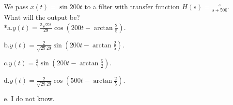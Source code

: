 
We pass \(x\left( t \right) = \sin 200t\) to a filter with transfer function \(H\left( s \right) = \frac{s}{s + 500}\). What will the output be?\\

*a.\(y\left( t \right) = \frac{2\sqrt{29}}{29}\cos\left( 200t - \arctan\frac{2}{5} \right)\).

b.\(y\left( t \right) = \frac{2}{\sqrt{29}29}\sin\left( 200t - \arctan\frac{2}{5} \right)\).

c.\(y\left( t \right) = \frac{2}{7}\sin\left( 200t - \arctan\frac{5}{2} \right)\).

d.\(y\left( t \right) = \frac{2}{\sqrt{29}29}\cos\left( 500t - \arctan\frac{2}{5} \right)\).

e. I do not know.\\
